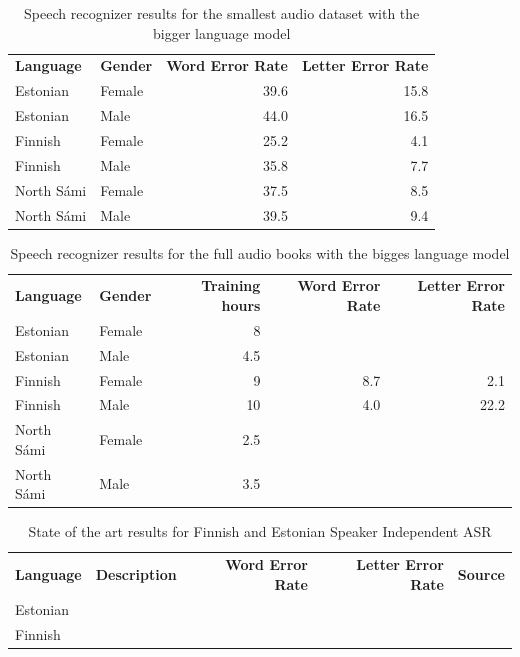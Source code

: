 \documentclass[b5paper]{article}
\newcommand{\ns}{{North Sámi }}
\begin{document}
\begin{table}[h!]

\centering
\begin{tabular}{llrr}
\textbf{Language} & \textbf{Gender} & \textbf{Word Error Rate} & \textbf{Letter Error Rate}\\
Estonian & Female & 39.6 & 15.8 \\
Estonian & Male & 44.0 & 16.5\\
Finnish & Female & 25.2 &4.1 \\
Finnish & Male &  35.8 & 7.7 \\
\ns & Female & 37.5 & 8.5 \\
\ns & Male & 39.5 & 9.4 \\
\end{tabular}
\caption{Speech recognizer results for the smallest audio dataset with the bigger language model \label{tbl:resultssmallcomp}}
\end{table}


\begin{table}[h!]

\centering
\begin{tabular}{llrrr}
\textbf{Language} & \textbf{Gender} & \textbf{Training hours} & \textbf{Word Error Rate} & \textbf{Letter Error Rate}\\
Estonian & Female & 8 &  &  \\
Estonian & Male & 4.5 & & \\
Finnish & Female & 9  & 8.7 & 2.1 \\
Finnish & Male & 10  & 4.0 & 22.2  \\
\ns & Female & 2.5  & &  \\
\ns & Male & 3.5   & &  \\
\end{tabular}
\caption{Speech recognizer results for the full audio books with the bigges language model \label{tbl:resultbigcomp}}
\end{table}



\begin{table}[h!]

\centering
\begin{tabular}{llrrl}
\textbf{Language} & \textbf{Description} & \textbf{Word Error Rate} & \textbf{Letter Error Rate} & \textbf{Source}\\
Estonian &  & & &  \\
Finnish &  & & &  \\
\end{tabular}
\caption{State of the art results for Finnish and Estonian Speaker Independent ASR}
\end{table}
\end{document}

